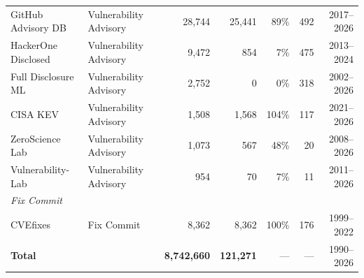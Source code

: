 \begin{table}[t]
\begin{tabular}{llrrrrr}
  GitHub Advisory DB & Vulnerability Advisory & 28,744 & 25,441 & 89\% & 492 & 2017--2026 \\
  HackerOne Disclosed & Vulnerability Advisory & 9,472 & 854 & 7\% & 475 & 2013--2024 \\
  Full Disclosure ML & Vulnerability Advisory & 2,752 & 0 & 0\% & 318 & 2002--2026 \\
  CISA KEV & Vulnerability Advisory & 1,508 & 1,568 & 104\% & 117 & 2021--2026 \\
  ZeroScience Lab & Vulnerability Advisory & 1,073 & 567 & 48\% & 20 & 2008--2026 \\
  Vulnerability-Lab & Vulnerability Advisory & 954 & 70 & 7\% & 11 & 2011--2026 \\
\midrule
\multicolumn{7}{l}{\textit{Fix Commit}} \\
  CVEfixes & Fix Commit & 8,362 & 8,362 & 100\% & 176 & 1999--2022 \\
\midrule
  \textbf{Total} & & \textbf{8,742,660} & \textbf{121,271} & — & — & 1990--2026 \\
\bottomrule
\end{tabular}
\end{table}